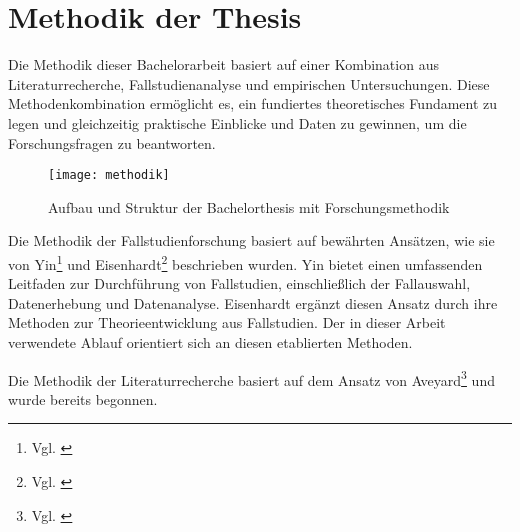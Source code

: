 
\section{Methodik der Thesis}

Die Methodik dieser Bachelorarbeit basiert auf einer Kombination aus Literaturrecherche, Fallstudienanalyse und empirischen Untersuchungen. Diese Methodenkombination ermöglicht es, ein fundiertes theoretisches Fundament zu legen und gleichzeitig praktische Einblicke und Daten zu gewinnen, um die Forschungsfragen zu beantworten.

\begin{figure}[H]
    \centering
    \texttt{[image: methodik]}
    \captionsetup{font=scriptsize}
    \caption{Aufbau und Struktur der Bachelorthesis mit Forschungsmethodik}
    \label{fig:methodik}
\end{figure}

Die Methodik der Fallstudienforschung basiert auf bewährten Ansätzen, wie sie von Yin\footnote{Vgl. \cite{Yin2017}} und Eisenhardt\footnote{Vgl. \cite{Eisenhardt1989}} beschrieben wurden. Yin bietet einen umfassenden Leitfaden zur Durchführung von Fallstudien, einschließlich der Fallauswahl, Datenerhebung und Datenanalyse. Eisenhardt ergänzt diesen Ansatz durch ihre Methoden zur Theorieentwicklung aus Fallstudien. Der in dieser Arbeit verwendete Ablauf orientiert sich an diesen etablierten Methoden.

Die Methodik der Literaturrecherche basiert auf dem Ansatz von Aveyard\footnote{Vgl. \cite{Aveyard2018}} und wurde bereits begonnen.


\clearpage